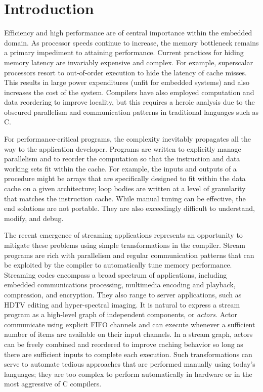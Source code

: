\section{Introduction}

Efficiency and high performance are of central importance within the
embedded domain.  As processor speeds continue to increase, the memory
bottleneck remains a primary impediment to attaining performance.
Current practices for hiding memory latency are invariably expensive
and complex.  For example, superscalar processors resort to
out-of-order execution to hide the latency of cache misses.  This
results in large power expenditures (unfit for embedded systems) and
also increases the cost of the system.  Compilers have also employed
computation and data reordering to improve locality, but this requires
a heroic analysis due to the obscured parallelism and communication
patterns in traditional languages such as C.

For performance-critical programs, the complexity inevitably
propagates all the way to the application developer.  Programs are
written to explicitly manage parallelism and to reorder the
computation so that the instruction and data working sets fit within
the cache.  For example, the inputs and outputs of a procedure might
be arrays that are specifically designed to fit within the data cache
on a given architecture; loop bodies are written at a level of
granularity that matches the instruction cache.  While manual tuning
can be effective, the end solutions are not portable.  They are also
exceedingly difficult to understand, modify, and debug.

The recent emergence of streaming applications represents an
opportunity to mitigate these problems using simple transformations in
the compiler.  Stream programs are rich with parallelism and regular
communication patterns that can be exploited by the compiler to
automatically tune memory performance.  Streaming codes encompass a
broad spectrum of applications, including embedded communications
processing, multimedia encoding and playback, compression, and
encryption.  They also range to server applications, such as HDTV
editing and hyper-spectral imaging.  It is natural to express a stream
program as a high-level graph of independent components, or {\it
actors}.  Actor communicate using explicit FIFO channels and can
execute whenever a sufficient number of items are available on their
input channels.  In a stream graph, actors can be freely combined and
reordered to improve caching behavior so long as there are sufficient
inputs to complete each execution.  Such transformations can serve to
automate tedious approaches that are performed manually using today's
languages; they are too complex to perform automatically in hardware
or in the most aggressive of C compilers.

